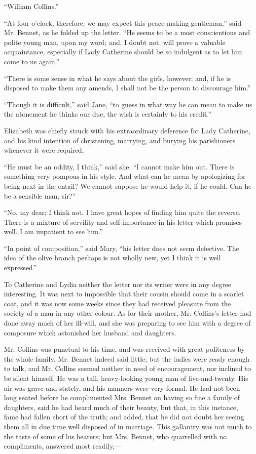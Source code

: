\documentclass[12pt,openright]{book}
\begin{document}
“William Collins.”


“At four o’clock, therefore, we may expect this peace-making gentleman,” said Mr. Bennet, as he folded up the letter. “He seems to be a most conscientious and polite young man, upon my word; and, I doubt not, will prove a valuable acquaintance, especially if Lady Catherine should be so indulgent as to let him come to us again.”

“There is some sense in what he says about the girls, however; and, if he is disposed to make them any amends, I shall not be the person to discourage him.”

“Though it is difficult,” said Jane, “to guess in what way he can mean to make us the atonement he thinks our due, the wish is certainly to his credit.”

Elizabeth was chiefly struck with his extraordinary deference for Lady Catherine, and his kind intention of christening, marrying, and burying his parishioners whenever it were required.

“He must be an oddity, I think,” said she. “I cannot make him out. There is something very pompous in his style. And what can he mean by apologizing for being next in the entail? We cannot suppose he would help it, if he could. Can he be a sensible man, sir?”

“No, my dear; I think not. I have great hopes of finding him quite the reverse. There is a mixture of servility and self-importance in his letter which promises well. I am impatient to see him.”

“In point of composition,” said Mary, “his letter does not seem defective. The idea of the olive branch perhaps is not wholly new, yet I think it is well expressed.”

To Catherine and Lydia neither the letter nor its writer were in any degree interesting. It was next to impossible that their cousin should come in a scarlet coat, and it was now some weeks since they had received pleasure from the society of a man in any other colour. As for their mother, Mr. Collins’s letter had done away much of her ill-will, and she was preparing to see him with a degree of composure which astonished her husband and daughters.

Mr. Collins was punctual to his time, and was received with great politeness by the whole family. Mr. Bennet indeed said little; but the ladies were ready enough to talk, and Mr. Collins seemed neither in need of encouragement, nor inclined to be silent himself. He was a tall, heavy-looking young man of five-and-twenty. His air was grave and stately, and his manners were very formal. He had not been long seated before he complimented Mrs. Bennet on having so fine a family of daughters, said he had heard much of their beauty, but that, in this instance, fame had fallen short of the truth; and added, that he did not doubt her seeing them all in due time well disposed of in marriage. This gallantry was not much to the taste of some of his hearers; but Mrs. Bennet, who quarrelled with no compliments, answered most readily,—
\end{document}
